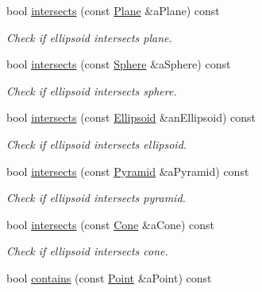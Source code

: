\begin{DoxyCompactItemize}
bool \hyperlink{classostk_1_1math_1_1geom_1_1d3_1_1objects_1_1_ellipsoid_a996a2dfe962cdb5dd5b16e3ee9bfdf62}{intersects} (const \hyperlink{classostk_1_1math_1_1geom_1_1d3_1_1objects_1_1_plane}{Plane} \&a\+Plane) const
\begin{DoxyCompactList}\small\item\em Check if ellipsoid intersects plane. \end{DoxyCompactList}\item 
bool \hyperlink{classostk_1_1math_1_1geom_1_1d3_1_1objects_1_1_ellipsoid_a48ab2b6828f42a314b185709126a0c43}{intersects} (const \hyperlink{classostk_1_1math_1_1geom_1_1d3_1_1objects_1_1_sphere}{Sphere} \&a\+Sphere) const
\begin{DoxyCompactList}\small\item\em Check if ellipsoid intersects sphere. \end{DoxyCompactList}\item 
bool \hyperlink{classostk_1_1math_1_1geom_1_1d3_1_1objects_1_1_ellipsoid_a2e886a6b074d7feada943ebc60f3d873}{intersects} (const \hyperlink{classostk_1_1math_1_1geom_1_1d3_1_1objects_1_1_ellipsoid}{Ellipsoid} \&an\+Ellipsoid) const
\begin{DoxyCompactList}\small\item\em Check if ellipsoid intersects ellipsoid. \end{DoxyCompactList}\item 
bool \hyperlink{classostk_1_1math_1_1geom_1_1d3_1_1objects_1_1_ellipsoid_a52ec9908e019762565ea341577b82944}{intersects} (const \hyperlink{classostk_1_1math_1_1geom_1_1d3_1_1objects_1_1_pyramid}{Pyramid} \&a\+Pyramid) const
\begin{DoxyCompactList}\small\item\em Check if ellipsoid intersects pyramid. \end{DoxyCompactList}\item 
bool \hyperlink{classostk_1_1math_1_1geom_1_1d3_1_1objects_1_1_ellipsoid_a74c6079e4c8d798892438f9560532f86}{intersects} (const \hyperlink{classostk_1_1math_1_1geom_1_1d3_1_1objects_1_1_cone}{Cone} \&a\+Cone) const
\begin{DoxyCompactList}\small\item\em Check if ellipsoid intersects cone. \end{DoxyCompactList}\item 
bool \hyperlink{classostk_1_1math_1_1geom_1_1d3_1_1objects_1_1_ellipsoid_a65985adadbc7de1e595c7ed326725f92}{contains} (const \hyperlink{classostk_1_1math_1_1geom_1_1d3_1_1objects_1_1_point}{Point} \&a\+Point) const

\end{DoxyCompactItemize}

